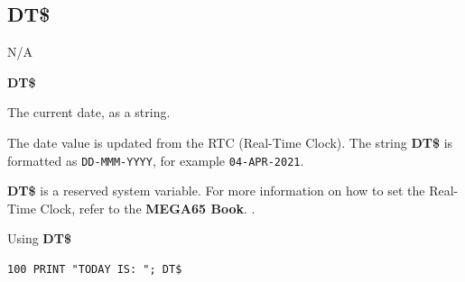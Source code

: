 \subsection{DT\$}
\begin{description}[leftmargin=2cm,style=nextline]
\item [Token:]    N/A

\item [Format:]   {\bf DT\$}

\item [Usage:]    The current date, as a string.

                  The date value is updated from the RTC (Real-Time Clock). The string {\bf DT\$} is formatted as \texttt{DD-MMM-YYYY}, for example \texttt{04-APR-2021}.

\item[Remarks:]   {\bf DT\$} is a reserved system variable. For more information on how to set the Real-Time Clock, refer to \ifdefined\printmanual
                     the {\bf MEGA65 Book}.
                  \else
                     .
                  \fi

\item [Example:]  Using {\bf DT\$}

\begin{tcolorbox}[colback=black,coltext=white]
\verbatimfont{\codefont}
\begin{verbatim}
100 PRINT "TODAY IS: "; DT$
\end{verbatim}
\end{tcolorbox}
\end{description}


\newpage
